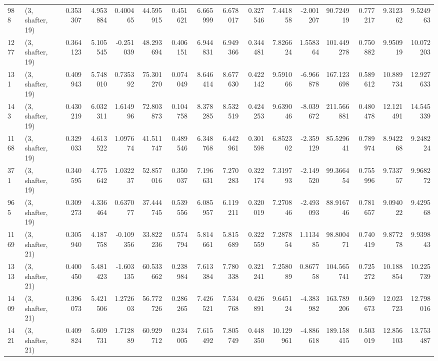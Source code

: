 \begin{tabular}{llrrrrrrrrrrrrrr}
988  &  (3, shafter, 19) &   0.353307 &   4.953884 &   0.400465 &     44.595915 &    0.451621 &    6.665999 &    6.678017 &  0.327546 &   7.441858 &  -2.001207 &    90.724919 &   0.777217 &   9.312362 &   9.524963 \\
1277 &  (3, shafter, 19) &   0.364123 &   5.105545 &  -0.251039 &     48.293694 &    0.406151 &    6.944831 &    6.949366 &  0.344481 &   7.826624 &   1.558364 &   101.449278 &   0.750882 &   9.950919 &  10.072203 \\
131  &  (3, shafter, 19) &   0.409943 &   5.748010 &   0.735392 &     75.301270 &    0.074049 &    8.646414 &    8.677630 &  0.422142 &   9.591066 &  -6.966878 &   167.123698 &   0.589612 &  10.889734 &  12.927633 \\
143  &  (3, shafter, 19) &   0.430219 &   6.032311 &   1.614996 &     72.803873 &    0.104758 &    8.378285 &    8.532519 &  0.424253 &   9.639046 &  -8.039672 &   211.566881 &   0.480478 &  12.121491 &  14.545339 \\
1168 &  (3, shafter, 19) &   0.329033 &   4.613522 &   1.097674 &     41.511747 &    0.489546 &    6.348768 &    6.442961 &  0.301598 &   6.852302 &  -2.359129 &    85.529641 &   0.789974 &   8.942268 &   9.248224 \\
371  &  (3, shafter, 19) &   0.340595 &   4.775642 &   1.032237 &     52.857016 &    0.350037 &    7.196631 &    7.270283 &  0.322174 &   7.319793 &  -2.149520 &    99.366454 &   0.755996 &   9.733757 &   9.968272 \\
965  &  (3, shafter, 19) &   0.309273 &   4.336464 &   0.637077 &     37.444745 &    0.539556 &    6.085957 &    6.119211 &  0.320019 &   7.270846 &  -2.493093 &    88.916746 &   0.781657 &   9.094022 &   9.429568 \\
1169 &  (3, shafter, 21) &   0.305940 &   4.187758 &  -0.109356 &     33.822236 &    0.574794 &    5.814661 &    5.815689 &  0.322559 &   7.287854 &   1.113485 &    98.800471 &   0.740419 &   9.877278 &   9.939843 \\
1313 &  (3, shafter, 21) &   0.400450 &   5.481423 &  -1.603135 &     60.533662 &    0.238984 &    7.613384 &    7.780338 &  0.321241 &   7.258089 &   0.867758 &   104.565741 &   0.725272 &  10.188854 &  10.225739 \\
1409 &  (3, shafter, 21) &   0.396073 &   5.421506 &   1.272603 &     56.772726 &    0.286265 &    7.426521 &    7.534768 &  0.426891 &   9.645124 &  -4.383982 &   163.789206 &   0.569673 &  12.023723 &  12.798016 \\
1421 &  (3, shafter, 21) &   0.409824 &   5.609731 &   1.712889 &     60.929712 &    0.234005 &    7.615492 &    7.805749 &  0.448350 &  10.129961 &  -4.886618 &   189.158415 &   0.503019 &  12.856103 &  13.753487 \\

\end{tabular}
